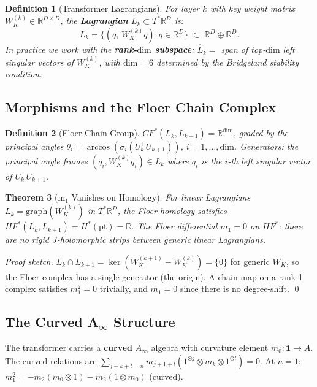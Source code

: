 \documentclass[11pt]{amsart}
\newtheorem{theorem}{Theorem}[section]
\newtheorem{definition}[theorem]{Definition}
\begin{document}
\begin{definition}[Transformer Lagrangians]
For layer $k$ with key weight matrix $W_K^{(k)} \in \mathbb{R}^{D\times D}$,
the \textbf{Lagrangian} $L_k \subset T^*\mathbb{R}^D$ is:
\[
  L_k = \bigl\{(q,\, W_K^{(k)} q) : q \in \mathbb{R}^D\bigr\}
  \;\subset\; \mathbb{R}^D \oplus \mathbb{R}^D.
\]
In practice we work with the \textbf{rank-$\mathrm{dim}$ subspace}:
$\hat{L}_k = $ span of top-$\mathrm{dim}$ left singular vectors of $W_K^{(k)}$,
with $\mathrm{dim}=6$ determined by the Bridgeland stability condition.
\end{definition}

\subsection{Morphisms and the Floer Chain Complex}

\begin{definition}[Floer Chain Group]
$CF^{*}(L_k, L_{k+1}) = \mathbb{R}^{\mathrm{dim}}$, graded by the
principal angles $\theta_i = \arccos(\sigma_i(U_k^\top U_{k+1}))$,
$i=1,\ldots,\mathrm{dim}$.
Generators: the principal angle frames $(q_i, W_K^{(k)}q_i) \in L_k$
where $q_i$ is the $i$-th left singular vector of $U_k^\top U_{k+1}$.
\end{definition}

\begin{theorem}[m$_1$ Vanishes on Homology]
\label{thm:m1zero}
For linear Lagrangians $L_k = \mathrm{graph}(W_K^{(k)})$ in $T^*\mathbb{R}^D$,
the Floer homology satisfies
$HF^{*}(L_k, L_{k+1}) = H^*(\mathrm{pt}) = \mathbb{R}$.
The Floer differential $m_1 = 0$ on $HF^{*}$:
there are no rigid $J$-holomorphic strips between generic linear Lagrangians.
\end{theorem}

\begin{proof}[Proof sketch]
$L_k \cap L_{k+1} = \ker(W_K^{(k+1)} - W_K^{(k)}) = \{0\}$ for generic
$W_K$, so the Floer complex has a single generator (the origin).
A chain map on a rank-1 complex satisfies $m_1^2=0$ trivially,
and $m_1=0$ since there is no degree-shift. \qed
\end{proof}

\subsection{The Curved A$_\infty$ Structure}

The transformer carries a \textbf{curved} $A_\infty$ algebra
with curvature element $m_0: \mathbf{1}\to A$.
The curved relations are $\sum_{j+k+l=n} m_{j+1+l}(1^{\otimes j}\otimes m_k\otimes 1^{\otimes l})=0$.
At $n=1$: $m_1^2 = -m_2(m_0\otimes 1)-m_2(1\otimes m_0)$ (curved).
\end{document}

